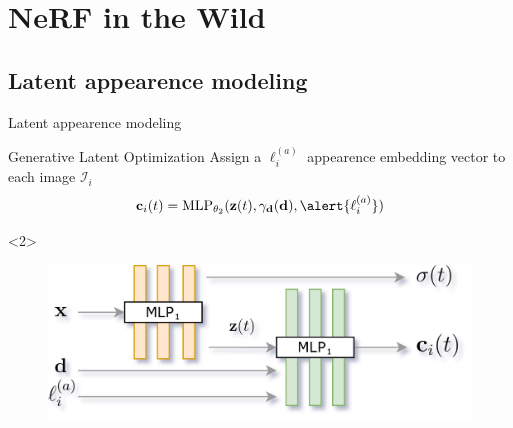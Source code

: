 \documentclass[aspectratio=1610]{beamer}
\begin{document}
\section{NeRF in the Wild}

\subsection{Latent appearence modeling}
\begin{frame}{Latent appearence modeling}
    \begin{block}{Generative Latent Optimization}
        Assign a \(\ell_i^{(a)}\) 
        appearence embedding vector to each image \(\mathcal{I}_i\)
        \begin{equation*}
            \vb{c}_i(t) = \textrm{MLP}_{\theta_2} (\vb{z}(t), \gamma_{\vb{d}}(\vb{d}), \alert{\ell_i^{(a)}})
        \end{equation*}
    \end{block}
    \begin{onlyenv}<2>
        \bigskip
        \begin{figure}[H]
            \centering
            \includegraphics[width=.65\textwidth,keepaspectratio]{nerfa-architecture.png}
        \end{figure}
    \end{onlyenv}
\end{frame}
\end{document}
